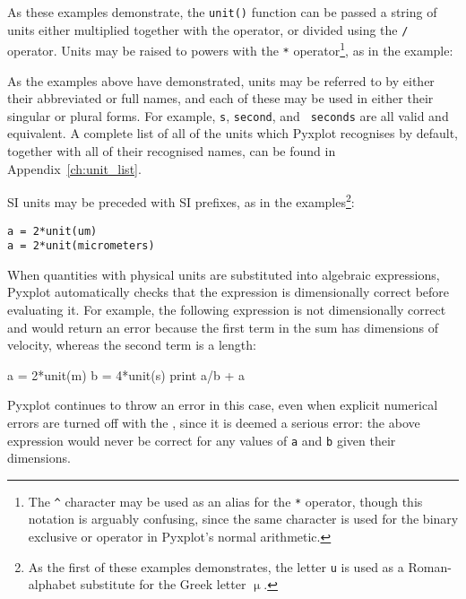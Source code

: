 \noindent As these examples demonstrate, the {\tt unit()} function can be
passed a string of units either multiplied together with the {\tt *} operator,
or divided using the {\tt /} operator. Units may be raised to powers with the
{\tt **} operator\footnote{The {\tt \^{}} character may be used as an alias for
the {\tt **} operator, though this notation is arguably confusing, since the
same character is used for the binary exclusive or operator in Pyxplot's normal
arithmetic.}, as in the example:

\vspace{3mm}

\vspace{3mm}

\noindent As the examples above have demonstrated, units may be referred to by
either their abbreviated or full names, and each of these may be used in either
their singular or plural forms. For example, {\tt s}, {\tt second}, and {\tt
seconds} are all valid and equivalent. A complete list of all of the units
which Pyxplot recognises by default, together with all of their recognised
names, can be found in Appendix~\ref{ch:unit_list}.

SI units may be preceded with SI prefixes, as in
the examples\footnote{As the first of these examples demonstrates, the letter
{\tt u} is used as a Roman-alphabet substitute for the Greek letter $\upmu$.}:

\begin{verbatim}
a = 2*unit(um)
a = 2*unit(micrometers)
\end{verbatim}

When quantities with physical units are substituted into algebraic expressions,
Pyxplot automatically checks that the expression is dimensionally correct
before evaluating it. For example, the following expression is not
dimensionally correct and would return an error because the first term in the
sum has dimensions of velocity, whereas the second term is a length:

\begin{dontdo}
a = 2*unit(m)\newline
b = 4*unit(s)\newline
print a/b + a
\end{dontdo}

\noindent Pyxplot continues to throw an error in this case, even when explicit
numerical errors are turned off with the ,
since it is deemed a serious error: the above expression would never be correct
for any values of {\tt a} and {\tt b} given their dimensions.

